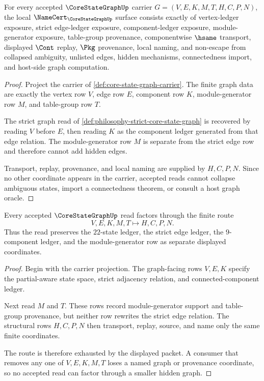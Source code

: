 \begin{theorem}
\label{thm:core-state-graph-namecert-obligations}
For every accepted $\CoreStateGraphUp$ carrier $G=(V,E,K,M,T,H,C,P,N)$, the local $\NameCert_{\CoreStateGraphUp}$ surface consists exactly of vertex-ledger exposure, strict edge-ledger exposure, component-ledger exposure, module-generator exposure, table-group provenance, componentwise $\hsame$ transport, displayed $\Cont$ replay, $\Pkg$ provenance, local naming, and non-escape from collapsed ambiguity, unlisted edges, hidden mechanisms, connectedness import, and host-side graph computation.
\end{theorem}
\begin{proof}
Project the carrier of \autoref{def:core-state-graph-carrier}. The finite graph data are exactly the vertex row $V$, edge row $E$, component row $K$, module-generator row $M$, and table-group row $T$.

The strict graph read of \autoref{def:philosophy-strict-core-state-graph} is recovered by reading $V$ before $E$, then reading $K$ as the component ledger generated from that edge relation. The module-generator row $M$ is separate from the strict edge row and therefore cannot add hidden edges.

Transport, replay, provenance, and local naming are supplied by $H,C,P,N$. Since no other coordinate appears in the carrier, accepted reads cannot collapse ambiguous states, import a connectedness theorem, or consult a host graph oracle.
\end{proof}

\begin{theorem}
\label{thm:core-state-graph-finite-acceptance-route}
Every accepted $\CoreStateGraphUp$ read factors through the finite route
$$
V,E,K,M,T \longmapsto H,C,P,N .
$$
Thus the read preserves the $22$-state ledger, the strict edge ledger, the $9$-component ledger, and the module-generator row as separate displayed coordinates.
\end{theorem}
\begin{proof}
Begin with the carrier projection. The graph-facing rows $V,E,K$ specify the partial-aware state space, strict adjacency relation, and connected-component ledger.

Next read $M$ and $T$. These rows record module-generator support and table-group provenance, but neither row rewrites the strict edge relation. The structural rows $H,C,P,N$ then transport, replay, source, and name only the same finite coordinates.

The route is therefore exhausted by the displayed packet. A consumer that removes any one of $V,E,K,M,T$ loses a named graph or provenance coordinate, so no accepted read can factor through a smaller hidden graph.
\end{proof}

